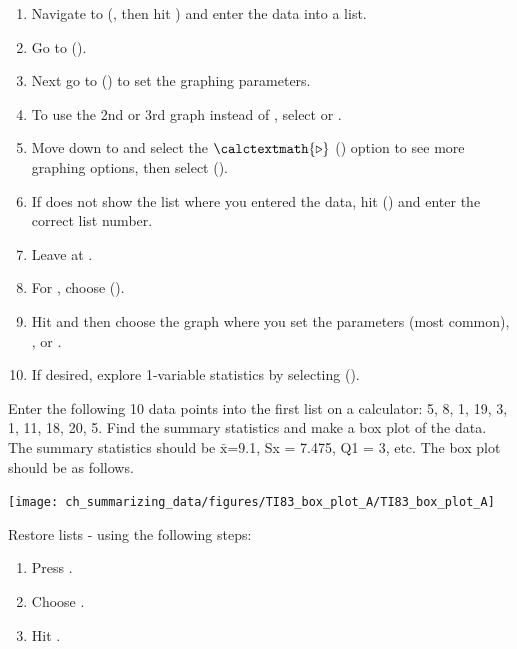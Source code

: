 \begin{termBox}{
\begin{enumerate}
\setlength{\itemsep}{0mm}
\item Navigate to  (, then hit ) and enter the data into a list.
\item Go to  ().
\item Next go to  () to set the graphing parameters.
\item To use the 2nd or 3rd graph instead of , select  or .
\item Move down to  and select the $\calctextmath{\triangleright}$ () option to see more graphing options, then select  ().
\item If  does not show the list where you entered the data, hit  () and enter the correct list number.
\item Leave  at .
\item For , choose  ().
\item Hit  and then choose the graph where you set the parameters  (most common), , or .
\item If desired, explore 1-variable statistics by selecting  ().
\end{enumerate}
}
\end{termBox}

\begin{example}{Enter the following 10 data points into the first list on a calculator: {5, 8, 1, 19, 3, 1, 11, 18, 20, 5}. Find the summary statistics and make a box plot of the data.}
The summary statistics should be $\bar{\text{x}}$=9.1, Sx = 7.475, Q1 = 3, etc. The box plot should be as follows.
\begin{center}
\texttt{[image: ch\_summarizing\_data/figures/TI83\_box\_plot\_A/TI83\_box\_plot\_A]}
\end{center}
\end{example}

\begin{tipBox}{
Restore lists - using the following steps:
\begin{enumerate}
\setlength{\itemsep}{0mm}
\item Press .
\item Choose .
\item Hit .
\end{enumerate}}
\end{tipBox}

